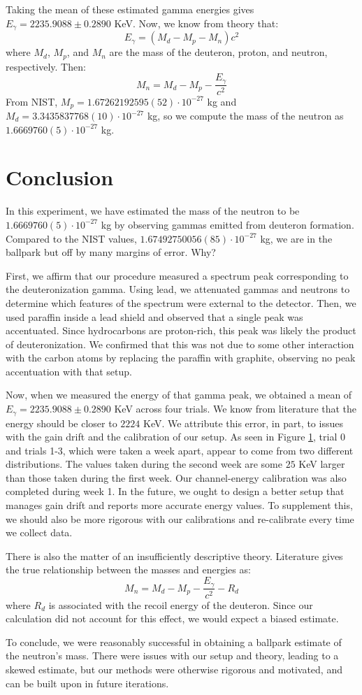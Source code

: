 \documentclass[12pt, letterpaper]{article}
\begin{document}
Taking the mean of these estimated gamma energies gives $E_\gamma = 2235.9088 \pm 0.2890$ KeV. Now, we know from theory that:
\[
E_\gamma = (M_d - M_p - M_n)c^2
\]
where $M_d$, $M_p$, and $M_n$ are the mass of the deuteron, proton, and neutron, respectively. Then:
\[
M_n = M_d - M_p - \frac{E_\gamma}{c^2}
\]
From NIST, $M_p = 1.67262192595(52) \cdot 10^{-27}$ kg and $M_d = 3.3435837768(10) \cdot 10^{-27}$ kg, so we compute the mass of the neutron as $1.6669760(5) \cdot 10^{-27}$ kg. 

\section{Conclusion}

In this experiment, we have estimated the mass of the neutron to be $1.6669760(5) \cdot 10^{-27}$ kg by observing gammas emitted from deuteron formation. Compared to the NIST values, $1.674 927 500 56(85) \cdot 10^{-27}$ kg, we are in the ballpark but off by many margins of error. Why? 

First, we affirm that our procedure measured a spectrum peak corresponding to the deuteronization gamma. Using lead, we attenuated gammas and neutrons to determine which features of the spectrum were external to the detector. Then, we used paraffin inside a lead shield and observed that a single peak was accentuated. Since hydrocarbons are proton-rich, this peak was likely the product of deuteronization. We confirmed that this was not due to some other interaction with the carbon atoms by replacing the paraffin with graphite, observing no peak accentuation with that setup. 

Now, when we measured the energy of that gamma peak, we obtained a mean of $E_\gamma = 2235.9088 \pm 0.2890$ KeV across four trials. We know from literature that the energy should be closer to $2224$ KeV. We attribute this error, in part, to issues with the gain drift and the calibration of our setup. As seen in Figure \ref{}, trial 0 and trials 1-3, which were taken a week apart, appear to come from two different distributions. The values taken during the second week are some $25$ KeV larger than those taken during the first week. Our channel-energy calibration was also completed during week 1. In the future, we ought to design a better setup that manages gain drift and reports more accurate energy values. To supplement this, we should also be more rigorous with our calibrations and re-calibrate every time we collect data. 

There is also the matter of an insufficiently descriptive theory. Literature gives the true relationship between the masses and energies as:
\[
M_n = M_d - M_p - \frac{E_\gamma}{c^2} - R_{d}
\]
where $R_d$ is associated with the recoil energy of the deuteron. Since our calculation did not account for this effect, we would expect a biased estimate. 

To conclude, we were reasonably successful in obtaining a ballpark estimate of the neutron's mass. There were issues with our setup and theory, leading to a skewed estimate, but our methods were otherwise rigorous and motivated, and can be built upon in future iterations. 
\end{document}
